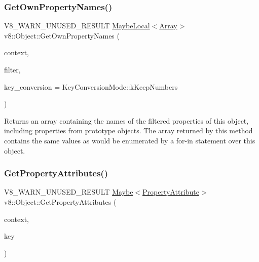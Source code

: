 \subsubsection{\texorpdfstring{Get\+Own\+Property\+Names()}{GetOwnPropertyNames()}}
{\footnotesize\ttfamily V8\+\_\+\+W\+A\+R\+N\+\_\+\+U\+N\+U\+S\+E\+D\+\_\+\+R\+E\+S\+U\+LT \mbox{\hyperlink{classv8_1_1MaybeLocal}{Maybe\+Local}}$<$\mbox{\hyperlink{classv8_1_1Array}{Array}}$>$ v8\+::\+Object\+::\+Get\+Own\+Property\+Names (\begin{DoxyParamCaption}\item[{\mbox{\hyperlink{classv8_1_1Local}{Local}}$<$ Context $>$}]{context,  }\item[{\mbox{\hyperlink{namespacev8_afbf02b6b1152a3e25d7bde90798209ac}{Property\+Filter}}}]{filter,  }\item[{\mbox{\hyperlink{namespacev8_aa65aeff871614520d8033dead4b34e38}{Key\+Conversion\+Mode}}}]{key\+\_\+conversion = {\ttfamily KeyConversionMode\+:\+:kKeepNumbers} }\end{DoxyParamCaption})}

Returns an array containing the names of the filtered properties of this object, including properties from prototype objects. The array returned by this method contains the same values as would be enumerated by a for-\/in statement over this object. \mbox{\label{classv8_1_1Object_ae5c97a596bcb634c50605a574358a9c6}} 
\subsubsection{\texorpdfstring{Get\+Property\+Attributes()}{GetPropertyAttributes()}}
{\footnotesize\ttfamily V8\+\_\+\+W\+A\+R\+N\+\_\+\+U\+N\+U\+S\+E\+D\+\_\+\+R\+E\+S\+U\+LT \mbox{\hyperlink{classv8_1_1Maybe}{Maybe}}$<$\mbox{\hyperlink{namespacev8_a05f25f935e108a1ea2d150e274602b87}{Property\+Attribute}}$>$ v8\+::\+Object\+::\+Get\+Property\+Attributes (\begin{DoxyParamCaption}\item[{\mbox{\hyperlink{classv8_1_1Local}{Local}}$<$ Context $>$}]{context,  }\item[{\mbox{\hyperlink{classv8_1_1Local}{Local}}$<$ \mbox{\hyperlink{classv8_1_1Value}{Value}} $>$}]{key }\end{DoxyParamCaption})}

